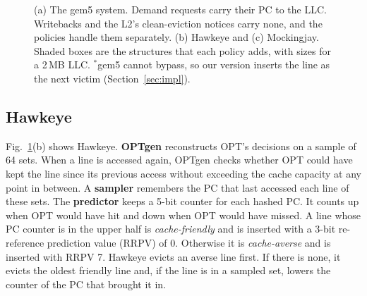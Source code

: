 \documentclass[11pt,conference]{IEEEtran}
\begin{document}
\begin{figure}[t]
{}
\caption{(a) The gem5 system. Demand requests carry their PC to the LLC.
Writebacks and the L2's clean-eviction notices carry none, and the policies
handle them separately. (b) Hawkeye and (c) Mockingjay. Shaded boxes are the
structures that each policy adds, with sizes for a 2\,MB LLC. $^{\ast}$gem5
cannot bypass, so our version inserts the line as the next victim
(Section~\ref{sec:impl}).}
\label{fig:arch}
\end{figure}

\subsection{Hawkeye}

Fig.~\ref{fig:arch}(b) shows Hawkeye. \textbf{OPTgen} reconstructs OPT's
decisions on a sample of 64 sets. When a line is accessed again, OPTgen checks
whether OPT could have kept the line since its previous access without
exceeding the cache capacity at any point in between. A \textbf{sampler}
remembers the PC that last accessed each line of these sets. The
\textbf{predictor} keeps a 5-bit counter for each hashed PC. It counts up when
OPT would have hit and down when OPT would have missed. A line whose PC counter
is in the upper half is \emph{cache-friendly} and is inserted with a 3-bit
re-reference prediction value (RRPV) of 0. Otherwise it is
\emph{cache-averse} and is inserted with RRPV 7. Hawkeye evicts an averse line
first. If there is none, it evicts the oldest friendly line and, if the line is
in a sampled set, lowers the counter of the PC that brought it in.
\end{document}
